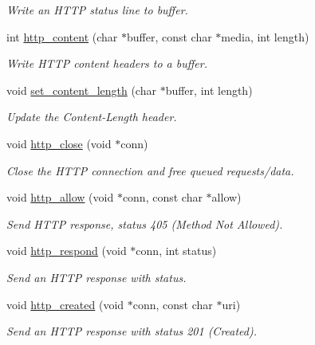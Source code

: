 \begin{DoxyCompactItemize}
\begin{DoxyCompactList}\small\item\em Write an H\+T\+TP status line to buffer. \end{DoxyCompactList}\item 
int \hyperlink{group__http__connection_ga5b43c4092965e502da226511bb574b44}{http\+\_\+content} (char $\ast$buffer, const char $\ast$media, int length)
\begin{DoxyCompactList}\small\item\em Write H\+T\+TP content headers to a buffer. \end{DoxyCompactList}\item 
void \hyperlink{group__http__connection_gaa36a00e63b21d521263da96cadd3ec44}{set\+\_\+content\+\_\+length} (char $\ast$buffer, int length)
\begin{DoxyCompactList}\small\item\em Update the Content-\/\+Length header. \end{DoxyCompactList}\item 
void \hyperlink{group__http__connection_ga83590f08e1aeaaa81b2873583ce99dd2}{http\+\_\+close} (void $\ast$conn)
\begin{DoxyCompactList}\small\item\em Close the H\+T\+TP connection and free queued requests/data. \end{DoxyCompactList}\item 
void \hyperlink{group__http__connection_ga1aeb6fb256def5da05c835071e41dfa0}{http\+\_\+allow} (void $\ast$conn, const char $\ast$allow)
\begin{DoxyCompactList}\small\item\em Send H\+T\+TP response, status 405 (Method Not Allowed). \end{DoxyCompactList}\item 
void \hyperlink{group__http__connection_gaa760070967803d689c4dd0fc407ff563}{http\+\_\+respond} (void $\ast$conn, int status)
\begin{DoxyCompactList}\small\item\em Send an H\+T\+TP response with status. \end{DoxyCompactList}\item 
void \hyperlink{group__http__connection_ga81402c76a79e0fdf3f0fb8d4c9ba52e9}{http\+\_\+created} (void $\ast$conn, const char $\ast$uri)
\begin{DoxyCompactList}\small\item\em Send an H\+T\+TP response with status 201 (Created). \end{DoxyCompactList}\item 

\end{DoxyCompactItemize}
